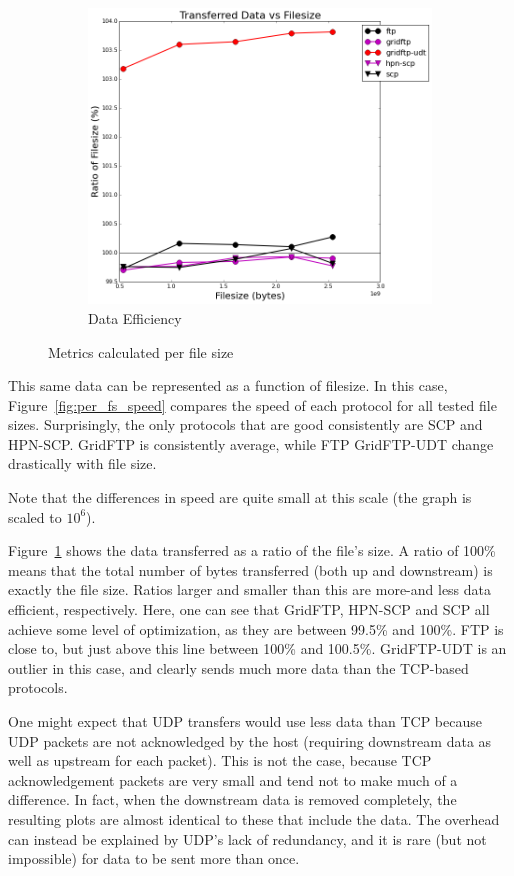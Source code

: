 \documentclass{sig-alternate-05-2015}
\begin{document}
\begin{figure}
\begin{subfigure}{.45\textwidth}
	\includegraphics[width=\textwidth]{img/per_filesize/data.png}
	\caption{Data Efficiency}
	\label{fig:per_fs_data}
	\end{subfigure}
\caption{Metrics calculated per file size}
\label{fig:per_fs}
\end{figure}

This same data can be represented as a function of filesize. In this case, Figure~\ref{fig:per_fs_speed} compares the speed of each protocol for all tested file sizes. Surprisingly, the only protocols that are good consistently are SCP and HPN-SCP. GridFTP is consistently average, while FTP GridFTP-UDT change drastically with file size. 

Note that the differences in speed are quite small at this scale (the graph is scaled to $10^6$).

Figure~\ref{fig:per_fs_data} shows the data transferred as a ratio of the file's size. A ratio of 100\% means that the total number of bytes transferred (both up and downstream) is exactly the file size. Ratios larger and smaller than this are more-and less data efficient, respectively.
Here, one can see that GridFTP, HPN-SCP and SCP all achieve some level of optimization, as they are between 99.5\% and 100\%. FTP is close to, but just above this line between 100\% and 100.5\%. GridFTP-UDT is an outlier in this case, and clearly sends much more data than the TCP-based protocols.

One might expect that UDP transfers would use less data than TCP because UDP packets are not acknowledged by the host (requiring downstream data as well as upstream for each packet). This is not the case, because TCP acknowledgement packets are very small and tend not to make much of a difference. In fact, when the downstream data is removed completely, the resulting plots are almost identical to these that include the data. The overhead can instead be explained by UDP's lack of redundancy, and it is rare (but not impossible) for data to be sent more than once.
\end{document}
